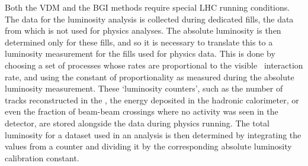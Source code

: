 Both the \ac{VDM} and the \ac{BGI} methods require special \ac{LHC} running 
conditions.
The data for the luminosity analysis is collected during dedicated fills, the 
data from which is not used for physics analyses.
The absolute luminosity is then determined only for these fills, and so it is 
necessary to translate this to a luminosity measurement for the fills used for 
physics data.
This is done by choosing a set of processes whose rates are proportional to the 
visible \pp\ interaction rate, and using the constant of proportionality as 
measured during the absolute luminosity measurement.
These `luminosity counters', such as the number of tracks reconstructed in the 
\velo, the energy deposited in the hadronic calorimeter, or even the fraction 
of beam-beam crossings where no activity was seen in the detector, are stored 
alongside the data during physics running.
The total luminosity for a dataset used in an analysis is then determined by 
integrating the values from a counter and dividing it by the corresponding 
absolute luminosity calibration constant.

